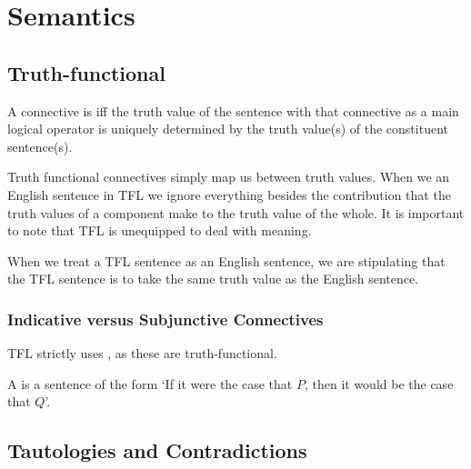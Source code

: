\documentclass[12pt, a4paper, twoside, openright, titlepage]{book}
\begin{document}
\chapter{\textsection\textsection Semantics}

\section{\textsection Truth-functional}


\begin{defn}{}{}
    A connective is  iff the truth value of the sentence with that connective as a main logical operator is uniquely determined by the truth value(s) of the constituent sentence(s).
\end{defn}

\begin{rmk}{}{}
    Truth functional connectives simply map us between truth values. When we  an English sentence in TFL we ignore everything besides the contribution that the truth values of a component make to the truth value of the whole. It is important to note that TFL is unequipped to deal with meaning.
\end{rmk}


\begin{defn}{}{}
    When we treat a TFL sentence as  an English sentence, we are stipulating that the TFL sentence is to take the same truth value as the English sentence.
\end{defn}

\subsection{\textsection Indicative versus Subjunctive Connectives}

\begin{defn}{}{}
    TFL strictly uses , as these are truth-functional.
\end{defn}


\begin{defn}{}{}
    A  is a sentence of the form `If it were the case that $P$, then it would be the case that $Q$'.
\end{defn}

\section{\textsection Tautologies and Contradictions}
\end{document}
